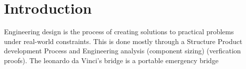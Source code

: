 \section{Introduction}
Engineering design is the process of creating solutions to practical problems under real-world
constraints. This is done mostly through a Structure Product development Process and Engineering
analysis (component sizing) (verfication proofs). The leonardo da Vinci's bridge is a portable
emergency bridge
